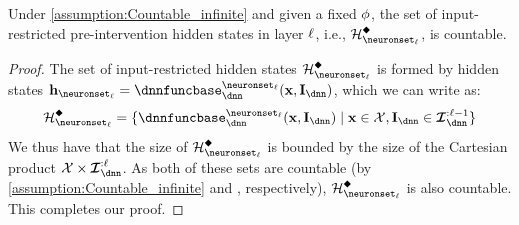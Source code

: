 \begin{lemma}\label{theorem:intervened_activations_countable_infinite}
    Under \cref{assumption:Countable_infinite} and given a fixed $\phi$, the set of input-restricted pre-intervention hidden states in layer $\ell$, i.e., $\AllInpIntActivationsLayer$, is countable.
\end{lemma}
\begin{proof}
    The set of input-restricted hidden states $\AllInpIntActivationsLayer$ is formed by hidden states 
    $\hiddenstates_{\neuronset_{\layer}} = \dnnfunclayer{\neuronset_{\layer}}(\bx, \interventions_{\dnn})$, which we can write as:
    \begin{align}
        \AllInpIntActivationsLayer
        = \{\dnnfunclayer{\neuronset_{\layer}}(\bx, \interventions_{\dnn}) \mid 
        \bx \in \calX, \interventionsdnn \in \interventionsset_{\dnn}^{:\layer-1} \}
    \end{align}
    We thus have that the size of $\AllInpIntActivationsLayer$ is bounded by the size of the Cartesian product $\calX \times \interventionsset_{\dnn}^{:\layer}$.
    As both of these sets are countable (by \cref{assumption:Countable_infinite} and , respectively), $\AllInpIntActivationsLayer$ is also countable. 
    This completes our proof.
\end{proof}

